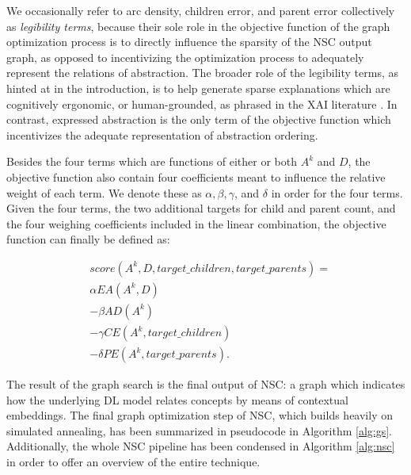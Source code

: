 We occasionally refer to arc density, children error, and parent error collectively as \textit{legibility terms}, because their sole role in the objective function of the graph optimization process is to directly influence the sparsity of the NSC output graph, as opposed to incentivizing the optimization process to adequately represent the relations of abstraction. The broader role of the legibility terms, as hinted at in the introduction, is to help generate sparse explanations which are cognitively ergonomic, or human-grounded, as phrased in the XAI literature \citep{madsen_post-hoc_2021}. In contrast, expressed abstraction is the only term of the objective function which incentivizes the adequate representation of abstraction ordering.

Besides the four terms which are functions of either or both $A^k$ and $D$, the objective function also contain four coefficients meant to influence the relative weight of each term. We denote these as $\alpha, \beta, \gamma$, and $\delta$ in order for the four terms. Given the four terms, the two additional targets for child and parent count, and the four weighing coefficients included in the linear combination, the objective function can finally be defined as:

\begin{align*}
     & score(A^k, D, target\_children, target\_parents) = \\
     & \alpha EA(A^k, D)                                  \\
     & - \beta AD(A^k)                                    \\
     & - \gamma CE(A^k, target\_children)                 \\
     & - \delta PE(A^k, target\_parents).
\end{align*}

The result of the graph search is the final output of NSC: a graph which indicates how the underlying DL model relates concepts by means of contextual embeddings. The final graph optimization step of NSC, which builds heavily on simulated annealing, has been summarized in pseudocode in Algorithm \ref{alg:gs}. Additionally, the whole NSC pipeline has been condensed in Algorithm \ref{alg:nsc} in order to offer an overview of the entire technique.


